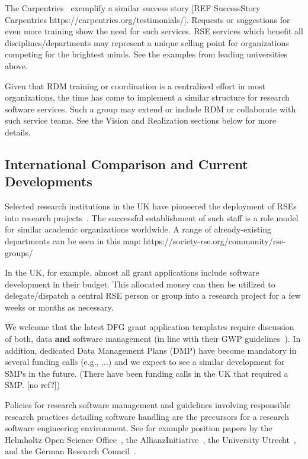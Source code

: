 \documentclass[a4paper]{article}
\begin{document}
The Carpentries~\autocite{Carpentries} exemplify a similar success story [REF SuccessStory Carpentries https://carpentries.org/testimonials/]. Requests or suggestions for even more training show the need for such services.
RSE services which benefit all disciplines/departments may represent a unique selling point for organizations competing for the brightest minds.
See the examples from leading universities above.

Given that RDM training or coordination is a centralized effort in most organizations, the time has come to implement a similar structure for research software services.
Such a group may extend or include RDM or collaborate with such service teams.
See the Vision and Realization sections below for more details.

\subsection{International Comparison and Current Developments}


Selected research institutions in the UK have pioneered the deployment of RSEs into research projects~\autocite{Crouch2013}. The successful establishment of such staff is a role model for similar academic organizations worldwide.
A range of already-existing departments can be seen in this map: https://society-rse.org/community/rse-groups/

In the UK, for example, almost all grant applications include software development in their budget.
This allocated money can then be utilized to delegate/dispatch a central RSE person or group into a research project for a few weeks or months as necessary.

We welcome that the latest DFG grant application templates require discussion of both, data \textbf{and} software management (in line with their GWP guidelines~\autocite{dfg_gsp}).
In addition, dedicated Data Management Plans (DMP) have become mandatory in several funding calls (e.g., ...) and we expect to see a similar development for SMPs in the future. (There have been funding calls in the UK that required a SMP. [no ref?]) 

Policies for research software management and guidelines involving responsible research practices detailing software handling are the precursors for a research software engineering environment.
See for example position papers by the Helmholtz Open Science Office~\autocite{Helmholtz2019a,Helmholtz2019b},
the AllianzInitiative~\autocite{Konrad2021},
the University Utrecht~\autocite{Utrecht2016b},
and the German Research Council~\autocite{dfg_gsp}.
\end{document}
